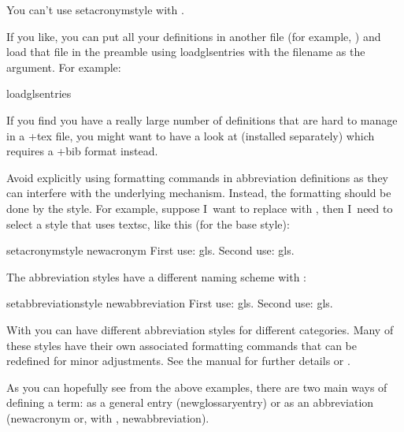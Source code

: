 \documentclass[titlepage=false,oneside,
 fontsize=12pt,captions=tableheading]{scrarticle}
\begin{document}
\begin{important}
You can't use \gls{setacronymstyle} with .
\end{important}

If you like, you can put all your definitions in another file (for
example, ) and load that file in the preamble using
\gls{loadglsentries} with the filename as the argument. For example:
\begin{codebox}
\gls{loadglsentries}
\end{codebox}
If you find you have a really large number of definitions that are
hard to manage in a \ext+{tex} file, you might want to have a
look at  (installed separately) which requires 
a \ext+{bib} format instead.

Avoid explicitly using formatting commands in abbreviation definitions 
as they can interfere with the underlying mechanism. Instead, the
formatting should be done by the style. For example, suppose I~want
to replace  with , then
I~need to select a style that uses \gls{textsc}, like this (for the
base  style):
\begin{codebox*}
\gls{setacronymstyle}
\gls{newacronym}
First use: \gls{gls}. Second use: \gls{gls}.
\end{codebox*}
The abbreviation styles have a different naming scheme with
:
\begin{codebox*}
\gls{setabbreviationstyle}
\gls{newabbreviation}
First use: \gls{gls}. Second use: \gls{gls}.
\end{codebox*}
With  you can have different abbreviation
styles for different categories. Many of these styles have their
own associated formatting commands that can be redefined 
for minor adjustments. See the  manual for
further details or .

As you can hopefully see from the above examples, there are two main ways of
defining a term: as a general entry (\gls{newglossaryentry}) or as an
abbreviation (\gls{newacronym} or, with ,
\gls{newabbreviation}).
\end{document}
